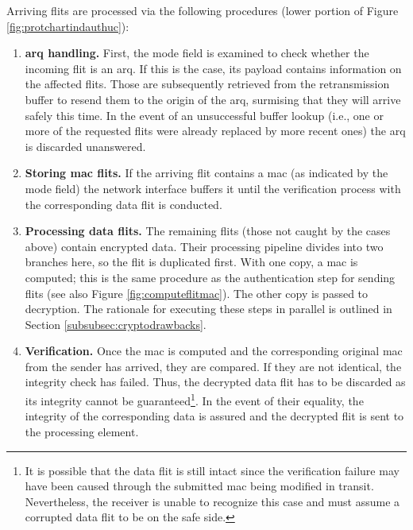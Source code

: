 Arriving flits are processed via the following procedures (lower portion of Figure \ref{fig:protchartindauthuc}):
\begin{enumerate}
    \item \textbf{\Gls{arq} handling.} First, the mode field is examined to check whether the incoming flit is an \gls{arq}. If this is the case, its
        payload contains information on the affected flits. Those are subsequently retrieved from the retransmission buffer to resend them to the
        origin of the \gls{arq}, surmising that they will arrive safely this time. In the event of an unsuccessful buffer lookup (i.e., one or more of
        the requested flits were already replaced by more recent ones) the \gls{arq} is discarded unanswered.
    \item \textbf{Storing \gls{mac} flits.} If the arriving flit contains a \gls{mac} (as indicated by the mode field) the network interface buffers
        it until the verification process with the corresponding data flit is conducted.
    \item \textbf{Processing data flits.} The remaining flits (those not caught by the cases above) contain encrypted data. Their processing pipeline
        divides into two branches here, so the flit is duplicated first. With one copy, a \gls{mac} is computed; this is the same procedure as the
        authentication step for sending flits (see also Figure \vref{fig:computeflitmac}). The other copy is passed to decryption. The rationale for
        executing these steps in parallel is outlined in Section \ref{subsubsec:cryptodrawbacks}.
    \item \textbf{Verification.} Once the \gls{mac} is computed and the corresponding original \gls{mac} from the sender has arrived, they are
        compared. If they are not identical, the integrity check has failed. Thus, the decrypted data flit has to be discarded as its integrity
        cannot be guaranteed\footnote{It is possible that the data flit is still intact since the verification failure may have been caused through
        the submitted \gls{mac} being modified in transit. Nevertheless, the receiver is unable to recognize this case and must assume a corrupted
        data flit to be on the safe side.}. In the event of their equality, the integrity of the corresponding data is assured and the decrypted flit
        is sent to the processing element.
\end{enumerate}
\vspace{0.5\baselineskip}


